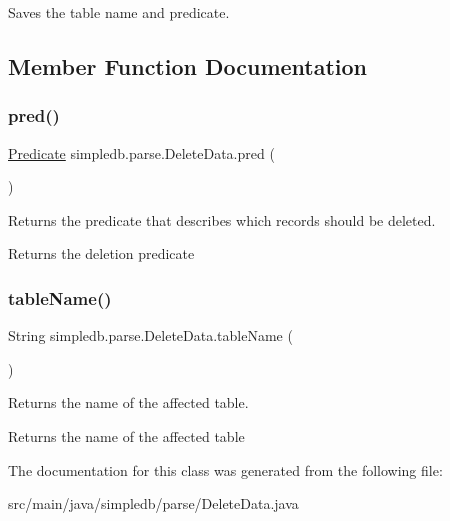 Saves the table name and predicate. 

\subsection{Member Function Documentation}
\mbox{\label{classsimpledb_1_1parse_1_1DeleteData_af248433241e8e934222dba32a25a32a5}} 
\subsubsection{\texorpdfstring{pred()}{pred()}}
{\footnotesize\ttfamily \hyperlink{classsimpledb_1_1query_1_1Predicate}{Predicate} simpledb.\+parse.\+Delete\+Data.\+pred (\begin{DoxyParamCaption}{ }\end{DoxyParamCaption})\hspace{0.3cm}{\ttfamily [inline]}}

Returns the predicate that describes which records should be deleted. \begin{DoxyReturn}{Returns}
the deletion predicate 
\end{DoxyReturn}
\mbox{\label{classsimpledb_1_1parse_1_1DeleteData_aa9b6a4399b885c2da9c3dd711cbd9b52}} 
\subsubsection{\texorpdfstring{table\+Name()}{tableName()}}
{\footnotesize\ttfamily String simpledb.\+parse.\+Delete\+Data.\+table\+Name (\begin{DoxyParamCaption}{ }\end{DoxyParamCaption})\hspace{0.3cm}{\ttfamily [inline]}}

Returns the name of the affected table. \begin{DoxyReturn}{Returns}
the name of the affected table 
\end{DoxyReturn}


The documentation for this class was generated from the following file\+:\begin{DoxyCompactItemize}
\item 
src/main/java/simpledb/parse/Delete\+Data.\+java\end{DoxyCompactItemize}
